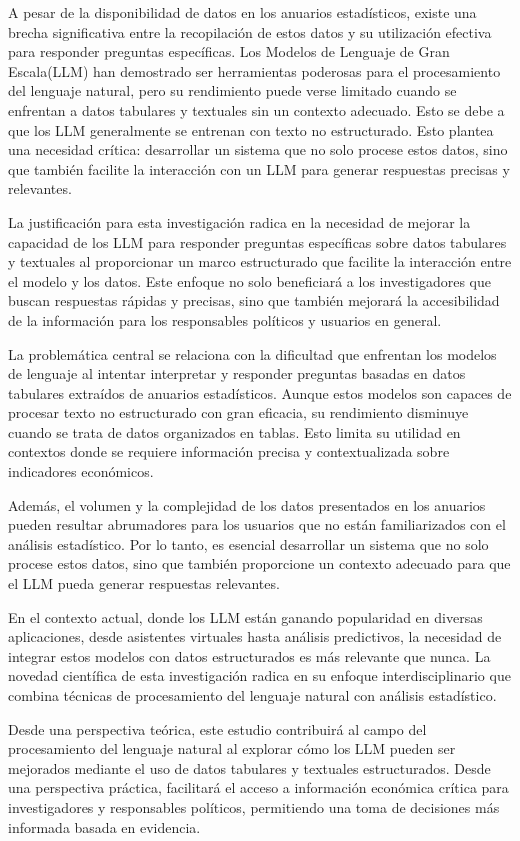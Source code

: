 \documentclass[12pt]{report} %
\begin{document}
A pesar de la disponibilidad de datos en los anuarios estadísticos, existe una brecha significativa entre la recopilación de estos datos y su utilización efectiva para responder preguntas específicas. Los Modelos de Lenguaje de Gran Escala(LLM) han demostrado ser herramientas poderosas para el procesamiento del lenguaje natural, pero su rendimiento puede verse limitado cuando se enfrentan a datos tabulares y textuales sin un contexto adecuado. Esto se debe a que los LLM generalmente se entrenan con texto no estructurado. Esto plantea una necesidad crítica: desarrollar un sistema que no solo procese estos datos, sino que también facilite la interacción con un LLM para generar respuestas precisas y relevantes.\par
La justificación para esta investigación radica en la necesidad de mejorar la capacidad de los LLM para responder preguntas específicas sobre datos tabulares y textuales al proporcionar un marco estructurado que facilite la interacción entre el modelo y los datos. Este enfoque no solo beneficiará a los investigadores que buscan respuestas rápidas y precisas, sino que también mejorará la accesibilidad de la información para los responsables políticos y usuarios en general.\par

La problemática central se relaciona con la dificultad que enfrentan los modelos de lenguaje al intentar interpretar y responder preguntas basadas en datos tabulares extraídos de anuarios estadísticos. Aunque estos modelos son capaces de procesar texto no estructurado con gran eficacia, su rendimiento disminuye cuando se trata de datos organizados en tablas. Esto limita su utilidad en contextos donde se requiere información precisa y contextualizada sobre indicadores económicos.\par
Además, el volumen y la complejidad de los datos presentados en los anuarios pueden resultar abrumadores para los usuarios que no están familiarizados con el análisis estadístico. Por lo tanto, es esencial desarrollar un sistema que no solo procese estos datos, sino que también proporcione un contexto adecuado para que el LLM pueda generar respuestas relevantes.\par

En el contexto actual, donde los LLM están ganando popularidad en diversas aplicaciones, desde asistentes virtuales hasta análisis predictivos, la necesidad de integrar estos modelos con datos estructurados es más relevante que nunca. La novedad científica de esta investigación radica en su enfoque interdisciplinario que combina técnicas de procesamiento del lenguaje natural con análisis estadístico.\par
Desde una perspectiva teórica, este estudio contribuirá al campo del procesamiento del lenguaje natural al explorar cómo los LLM pueden ser mejorados mediante el uso de datos tabulares y textuales estructurados. Desde una perspectiva práctica, facilitará el acceso a información económica crítica para investigadores y responsables políticos, permitiendo una toma de decisiones más informada basada en evidencia.\par
\end{document}
